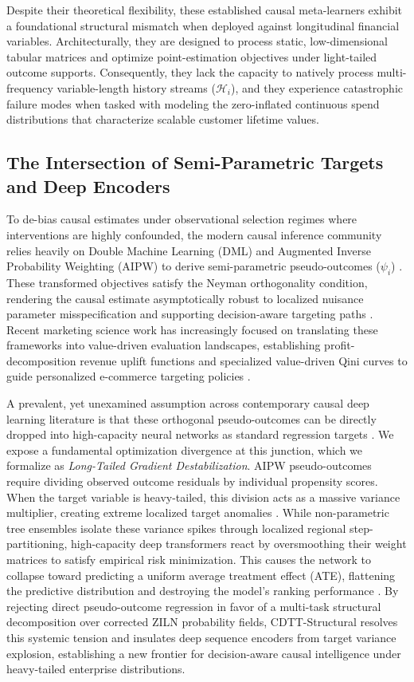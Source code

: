 \documentclass[10pt, conference]{IEEEtran}
\newcommand{\ourmodel}{CDTT}
\begin{document}
Despite their theoretical flexibility, these established causal meta-learners exhibit a foundational structural mismatch when deployed against longitudinal financial variables. Architecturally, they are designed to process static, low-dimensional tabular matrices and optimize point-estimation objectives under light-tailed outcome supports. Consequently, they lack the capacity to natively process multi-frequency variable-length history streams ($\mathcal{H}_i$), and they experience catastrophic failure modes when tasked with modeling the zero-inflated continuous spend distributions that characterize scalable customer lifetime values.

\subsection{The Intersection of Semi-Parametric Targets and Deep Encoders}
To de-bias causal estimates under observational selection regimes where interventions are highly confounded, the modern causal inference community relies heavily on Double Machine Learning (DML) and Augmented Inverse Probability Weighting (AIPW) to derive semi-parametric pseudo-outcomes ($\psi_i$) \cite{Chernozhukov2018, Kennedy2023, Oprescu2019}. These transformed objectives satisfy the Neyman orthogonality condition, rendering the causal estimate asymptotically robust to localized nuisance parameter misspecification and supporting decision-aware targeting paths \cite{Buckinx2005, Lessmann2018}. Recent marketing science work has increasingly focused on translating these frameworks into value-driven evaluation landscapes, establishing profit-decomposition revenue uplift functions and specialized value-driven Qini curves \cite{Gubela2021, Gubela2022} to guide personalized e-commerce targeting policies \cite{Jia2023, Marthalia2024}.

A prevalent, yet unexamined assumption across contemporary causal deep learning literature is that these orthogonal pseudo-outcomes can be directly dropped into high-capacity neural networks as standard regression targets \cite{Zhan2023, Ogundipe2025, Das2025}. We expose a fundamental optimization divergence at this junction, which we formalize as \textit{Long-Tailed Gradient Destabilization}. AIPW pseudo-outcomes require dividing observed outcome residuals by individual propensity scores. When the target variable is heavy-tailed, this division acts as a massive variance multiplier, creating extreme localized target anomalies \cite{Foster2004}. While non-parametric tree ensembles isolate these variance spikes through localized regional step-partitioning, high-capacity deep transformers react by oversmoothing their weight matrices to satisfy empirical risk minimization. This causes the network to collapse toward predicting a uniform average treatment effect (ATE), flattening the predictive distribution and destroying the model's ranking performance \cite{Verhelst2023}. By rejecting direct pseudo-outcome regression in favor of a multi-task structural decomposition over corrected ZILN probability fields, \ourmodel-Structural resolves this systemic tension and insulates deep sequence encoders from target variance explosion, establishing a new frontier for decision-aware causal intelligence under heavy-tailed enterprise distributions.
\end{document}
